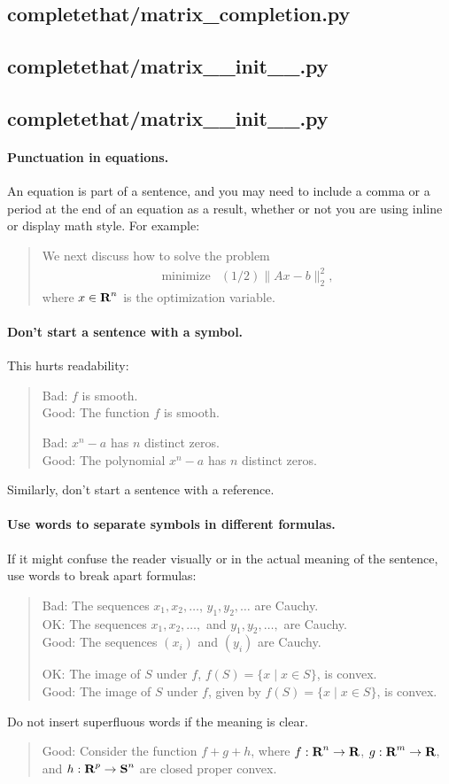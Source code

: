 \documentclass[12pt]{article}
\newcommand{\code}[2] {
  \hrulefill
  \subsection*{#1}
  
  \vspace{2em}
}
\begin{document}
\code{completethat/matrix\_completion.py}{../code/completethat/matrix_completion.py}
\code{completethat/matrix\_\_init\_\_.py}{../code/completethat/__init__.py}
\code{completethat/matrix\_\_init\_\_.py}{../code/setup.py}



\newpage



\paragraph{Punctuation in equations.}
An equation is part of a sentence, and you may need to include a comma or a period
at the end of an equation as a result, whether or not you are using inline or
display math style. For example:
\begin{quote}
    We next discuss how to solve the problem
    \[
        \begin{array}{ll}
            \mbox{minimize} & (1/2)\|Ax - b\|_2^2,
        \end{array}
    \]
    where $x \in {\mbox{\bf R}}^n$ is the optimization variable.
\end{quote}

\paragraph{Don't start a sentence with a symbol.}
This hurts readability:
\begin{quote}
Bad: $f$ is smooth.\\
Good: The function $f$ is smooth.

Bad: $x^n - a$ has $n$ distinct zeros. \\
Good: The polynomial $x^n - a$ has $n$ distinct zeros.
\end{quote}
Similarly, don't start a sentence with a reference.

\paragraph{Use words to separate symbols in different formulas.}
If it might confuse the reader visually or in the actual
meaning of the sentence, use words to break apart formulas:
\begin{quote}
Bad: The sequences $x_1, x_2, \dots$, $y_1, y_2, \dots$ are Cauchy. \\
OK: The sequences $x_1, x_2, \dots,$ and $y_1, y_2, \dots,$ are Cauchy. \\
Good: The sequences $(x_i)$ and $(y_i)$ are Cauchy.

OK: The image of $S$ under $f$, $f(S) = \{ x \mid x \in S \}$, is convex. \\
Good: The image of $S$ under $f$, given by $f(S) = \{ x \mid x \in S \}$, is convex.
\end{quote}
Do not insert superfluous words if the meaning is clear.
\begin{quote}
Good: Consider the function $f + g + h$, where $f : {\mbox{\bf R}}^n \to
{\mbox{\bf R}}$, $g : {\mbox{\bf R}}^m \to {\mbox{\bf R}}$, and $h : {\mbox{\bf R}}^p \to {\mbox{\bf S}}^n$ are closed
proper convex.
\end{quote}
\end{document}
